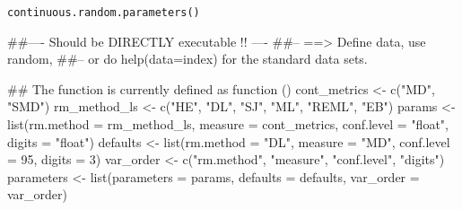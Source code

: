 \begin{Usage}
\begin{verbatim}
continuous.random.parameters()
\end{verbatim}
\end{Usage}
\begin{Examples}
\begin{ExampleCode}
##---- Should be DIRECTLY executable !! ----
##-- ==>  Define data, use random,
##--    or do  help(data=index)  for the standard data sets.

## The function is currently defined as
function () 
{
    cont_metrics <- c("MD", "SMD")
    rm_method_ls <- c("HE", "DL", "SJ", "ML", "REML", "EB")
    params <- list(rm.method = rm_method_ls, measure = cont_metrics, 
        conf.level = "float", digits = "float")
    defaults <- list(rm.method = "DL", measure = "MD", conf.level = 95, 
        digits = 3)
    var_order <- c("rm.method", "measure", "conf.level", "digits")
    parameters <- list(parameters = params, defaults = defaults, 
        var_order = var_order)
  }
\end{ExampleCode}
\end{Examples}

